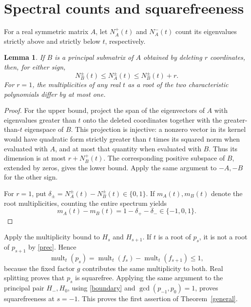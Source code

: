 \documentclass[11pt]{article}
\newtheorem{lemma}[theorem]{Lemma}
\newcommand{\mult}{\operatorname{mult}}
\begin{document}
\section{Spectral counts and squarefreeness}
For a real symmetric matrix $A$, let $N_A^+(t)$ and $N_A^-(t)$ count its
eigenvalues strictly above and strictly below $t$, respectively.
\begin{lemma}\label{counts}
If $B$ is a principal submatrix of $A$ obtained by deleting $r$ coordinates,
then, for either sign,
\[
 N_B^\pm(t)\le N_A^\pm(t)\le N_B^\pm(t)+r.
\]
For $r=1$, the multiplicities of any real $t$ as a root of the two
characteristic polynomials differ by at most one.
\end{lemma}
\begin{proof}
For the upper bound, project the span of the eigenvectors of $A$ with
eigenvalues greater than $t$ onto the deleted coordinates together with
the greater-than-$t$ eigenspace of $B$. This projection is injective:
a nonzero vector in its kernel would have quadratic form strictly greater
than $t$ times its squared norm when evaluated with $A$, and at most that
quantity when evaluated with $B$. Thus its dimension is at most
$r+N_B^+(t)$. The corresponding positive subspace of $B$, extended by zeros,
gives the lower bound. Apply the same argument to $-A,-B$ for the other sign.

For $r=1$, put
$\delta_\pm=N_A^\pm(t)-N_B^\pm(t)\in\{0,1\}$.
If $m_A(t),m_B(t)$ denote the root multiplicities, counting the entire
spectrum yields
\[
 m_A(t)-m_B(t)=1-\delta_+-\delta_-\in\{-1,0,1\}.
\]
\end{proof}

Apply the multiplicity bound to $H_s$ and $H_{s+1}$. If $t$ is a root
of $p_s$, it is not a root of $p_{s+1}$ by \eqref{prec}. Hence
\[
 \mult_t(p_s)=\mult_t(f_s)-\mult_t(f_{s+1})\le1,
\]
because the fixed factor $g$ contributes the same multiplicity to both.
Real splitting proves that $p_s$ is squarefree. Applying the same argument
to the principal pair $H_-,H_0$, using \eqref{boundary} and
$\gcd(p_{-1},p_0)=1$, proves squarefreeness at $s=-1$.
This proves the first assertion of Theorem~\ref{general}.
\end{document}
